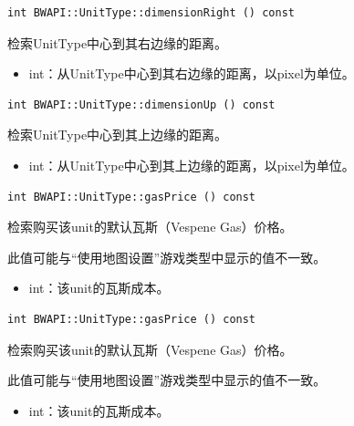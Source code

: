 \begin{tcolorbox}[colback=white, colframe=black!60!white, title=dimensionRight(), arc=0mm]
    \begin{verbatim}
int BWAPI::UnitType::dimensionRight () const
    \end{verbatim}
    检索UnitType中心到其右边缘的距离。
\begin{return}
\begin{itemize}
    \item int：从UnitType中心到其右边缘的距离，以pixel为单位。
\end{itemize}
\end{return}
\end{tcolorbox}


\begin{tcolorbox}[colback=white, colframe=black!60!white, title=dimensionUp(), arc=0mm]
    \begin{verbatim}
int BWAPI::UnitType::dimensionUp () const
    \end{verbatim}
    检索UnitType中心到其上边缘的距离。
\begin{return}
\begin{itemize}
    \item int：从UnitType中心到其上边缘的距离，以pixel为单位。
\end{itemize}
\end{return}
\end{tcolorbox}


\begin{tcolorbox}[colback=white, colframe=black!60!white, title=gasPrice(), arc=0mm]
    \begin{verbatim}
int BWAPI::UnitType::gasPrice () const
    \end{verbatim}
    检索购买该unit的默认瓦斯（Vespene Gas）价格。
\begin{note}
    此值可能与“使用地图设置”游戏类型中显示的值不一致。
\end{note}
\begin{return}
\begin{itemize}
    \item int：该unit的瓦斯成本。
\end{itemize}
\end{return}
\end{tcolorbox}


\begin{tcolorbox}[colback=white, colframe=black!60!white, title=gasPrice(), arc=0mm]
    \begin{verbatim}
int BWAPI::UnitType::gasPrice () const
    \end{verbatim}
    检索购买该unit的默认瓦斯（Vespene Gas）价格。
\begin{note}
    此值可能与“使用地图设置”游戏类型中显示的值不一致。
\end{note}
\begin{return}
\begin{itemize}
    \item int：该unit的瓦斯成本。
\end{itemize}
\end{return}
\end{tcolorbox}


